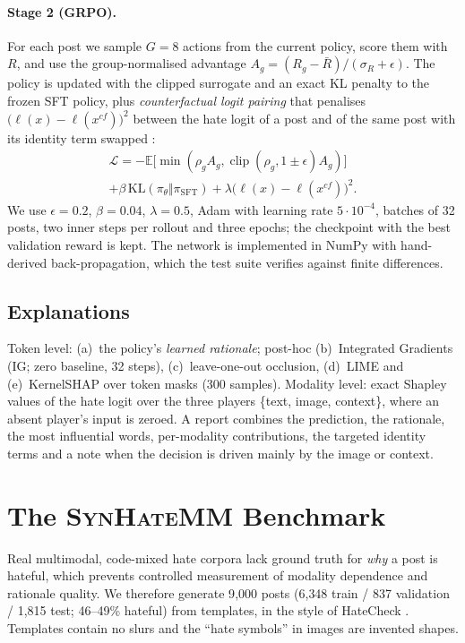 \documentclass[11pt]{article}
\newcommand{\pihat}{\pi_\theta}
\begin{document}
\paragraph{Stage 2 (GRPO).} For each post we sample $G{=}8$ actions from the current policy, score them with $R$, and
use the group-normalised advantage $A_g=(R_g-\bar R)/(\sigma_R+\epsilon)$. The policy is updated with the clipped
surrogate and an exact KL penalty to the frozen SFT policy, plus \emph{counterfactual logit pairing} that penalises
$\big(\ell(x)-\ell(x^{cf})\big)^2$ between the hate logit of a post and of the same post with its identity term swapped
\citep{garg2019counterfactual}:
\begin{multline}
\mathcal L=-\mathbb E\big[\min(\rho_g A_g,\operatorname{clip}(\rho_g,1{\pm}\epsilon)A_g)\big]\\
+\beta\,\mathrm{KL}(\pihat\Vert\pi_{\mathrm{SFT}})+\lambda\big(\ell(x)-\ell(x^{cf})\big)^2 .
\end{multline}
We use $\epsilon{=}0.2$, $\beta{=}0.04$, $\lambda{=}0.5$, Adam with learning rate $5\cdot10^{-4}$, batches of 32 posts, two inner steps per rollout and three epochs;
the checkpoint with the best validation reward is kept. The network is implemented in NumPy with hand-derived back-propagation, which the test suite verifies against finite differences.

\subsection{Explanations}
Token level: (a)~the policy's \emph{learned rationale}; post-hoc (b)~Integrated Gradients (IG; zero baseline, 32 steps),
(c)~leave-one-out occlusion, (d)~LIME and (e)~KernelSHAP over token masks (300 samples). Modality level: exact Shapley values of the
hate logit over the three players \{text, image, context\}, where an absent player's input is zeroed. A report combines
the prediction, the rationale, the most influential words, per-modality contributions, the targeted identity terms and a note
when the decision is driven mainly by the image or context.

\section{The \textsc{SynHateMM} Benchmark}\label{sec:data}
Real multimodal, code-mixed hate corpora lack ground truth for \emph{why} a post is hateful, which prevents controlled measurement
of modality dependence and rationale quality. We therefore generate 9{,}000 posts (6{,}348 train / 837 validation / 1{,}815 test; 46--49\% hateful)
from templates, in the style of HateCheck \citep{rottger2021hatecheck}. Templates contain no slurs and the
``hate symbols'' in images are invented shapes.
\end{document}
